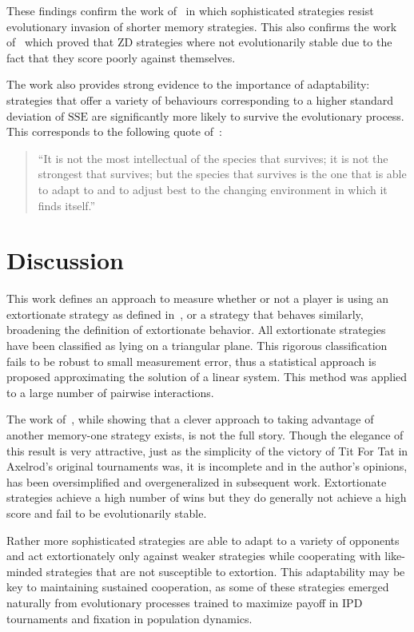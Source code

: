 \documentclass[a4paper]{article}
\newcommand{\SSe}{\text{SSE}}
\begin{document}
These findings confirm the work of~\cite{Moran1707} in which sophisticated
strategies resist evolutionary invasion of shorter memory strategies. This also
confirms the work of~\cite{adami2013evolutionary, hilbe2015partners} which
proved that ZD strategies where not evolutionarily stable due to the fact that
they score poorly against themselves.

The work also provides strong evidence to the importance of adaptability:
strategies that offer a variety of behaviours corresponding to a higher standard
deviation of \(\SSe\) are significantly more likely to survive the
evolutionary process. This corresponds to the following quote
of~\cite{darwin1869origin}:

\begin{quote}
``It is not the most intellectual of the species that survives; it is not the
strongest that survives; but the species that survives is the one that is able
to adapt to and to adjust best to the changing environment in which it finds
itself.''
\end{quote}

\section{Discussion}\label{sec:conclusion}

This work defines an approach to measure whether or not a player is using an
extortionate strategy as defined in~\cite{Press2012}, or a strategy that behaves
similarly, broadening the definition of extortionate behavior. All extortionate
strategies have been classified as lying on a triangular plane. This rigorous
classification fails to be robust to small measurement error, thus a statistical
approach is proposed approximating the solution of a linear system. 
This method
was applied to a large number of pairwise interactions.

The work of~\cite{Press2012}, while showing that a clever approach to taking
advantage of another memory-one strategy exists, is not the full story.
Though the elegance of this result is very attractive, just as the simplicity of
the victory of Tit For Tat in Axelrod's original tournaments was, it is
incomplete and in the author's opinions, has been oversimplified and
overgeneralized in subsequent work. Extortionate strategies achieve a high
number of wins but they do generally not achieve a high score and fail to be
evolutionarily stable.

Rather more sophisticated strategies are able to adapt to a variety of opponents
and act extortionately only against weaker strategies while cooperating with
like-minded strategies that are not susceptible to extortion. This adaptability
may be key to maintaining sustained cooperation, as some of these strategies
emerged naturally from evolutionary processes trained to maximize payoff in
IPD tournaments and fixation in population dynamics.
\end{document}
